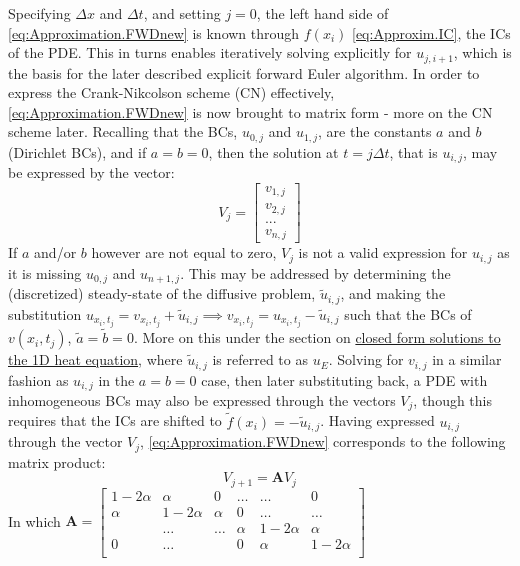 \documentclass[%
oneside,                 %
final,                   %
10pt]{article}
\begin{document}
Specifying $\Delta x$ and $\Delta t$, and setting $j=0$, the left hand side of \eqref{eq:Approximation.FWDnew} is known through $f(x_i)$ \eqref{eq:Approxim.IC}, the ICs of the PDE. This in turns enables iteratively solving explicitly for $u_{j,i+1}$, which is the basis for the later described explicit forward Euler algorithm. In order to express the Crank-Nikcolson scheme (CN) effectively, \eqref{eq:Approximation.FWDnew} is now brought to matrix form - more on the CN scheme later.  \newline
Recalling that the BCs, $u_{0,j}$ and $u_{1,j}$, are the constants $a$ and $b$ (Dirichlet BCs), and if $a=b=0$, then the solution at $t=j \Delta t$, that is $u_{i,j}$, may be expressed by the vector:
\begin{equation} 
V_j=
\begin{bmatrix}
v_{1,j} \\ v_{2,j} \\ ...\\ v_{n,j}
\end{bmatrix}
\end{equation}
If $a$ and/or $b$ however are not equal to zero, $V_j$ is not a valid expression for $u_{i,j}$ as it is missing $u_{0,j}$ and $u_{n+1,j}$. This may be addressed by determining the (discretized) steady-state of the diffusive problem, $\tilde{u}_{i,j}$, and making the substitution $u_{x_i,t_j}=v_{x_i,t_j}+\tilde{u}_{i,j} \implies v_{x_i,t_j}=u_{x_i,t_j}-\tilde{u}_{i,j}$ such that the BCs of $v(x_i,t_j)$, $\tilde{a}=\tilde{b}=0$. More on this under the section on \hyperref[M.CFS1d]{closed form solutions to the 1D heat equation}, where $\tilde{u}_{i,j}$ is referred to as $u_E$. Solving for $v_{i,j}$ in a similar fashion as $u_{i,j}$ in the $a=b=0$ case, then later substituting back, a PDE with inhomogeneous BCs may also be expressed through the vectors $V_j$, though this requires that the ICs are shifted to $\tilde{f}(x_i)=-\tilde{u}_{i,j}$.\newline
Having expressed $u_{i,j}$ through the vector $V_j$, \eqref{eq:Approximation.FWDnew} corresponds to the following matrix product:
\begin{equation}
V_{j+1}=\mathbf{A}V_j
\end{equation}
In which $\textbf{A}=  \begin{bmatrix}
                           1-2\alpha & \alpha & 0 &\dots   & \dots &0 \\
                           \alpha & 1-2\alpha  &  \alpha &0 &\dots &\dots \\
                           & \dots   & \dots &\alpha   &1-2\alpha& \alpha \\
                      
                           0&\dots    &  & 0  &\alpha & 1-2\alpha \\
              			\end{bmatrix}$ 
\newline
              			
\end{document}
